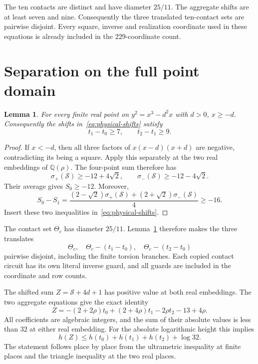 \documentclass[11pt,a4paper]{article}
\newtheorem{lemma}[theorem]{Lemma}
\newcommand{\Q}{\mathbb Q}\newcommand{\Z}{\mathbb Z}
\begin{document}
The ten contacts are distinct and have diameter $25/11$.
The aggregate shifts are at least seven and nine. Consequently
the three translated ten-contact sets are pairwise disjoint.
Every square, inverse and realization coordinate used in these
equations is already included in the 229-coordinate count.

\section{Separation on the full point domain}

\begin{lemma}\label{lem:separation}
For every finite real point on $y^2=x^3-d^2x$ with $d>0$,
$x\ge-d$. Consequently the shifts in~\eqref{eq:physical-shifts}
satisfy
\[
 t_1-t_0\ge7,\qquad t_2-t_1\ge9.
\]
\end{lemma}
\begin{proof}
If $x<-d$, then all three factors of $x(x-d)(x+d)$ are negative,
contradicting its being a square. Apply this separately at the two
real embeddings of $\Q(\rho)$. The four-point sum therefore has
\[
 \sigma_+(\mathcal S)\ge-12+4\sqrt2,
 \qquad \sigma_-(\mathcal S)\ge-12-4\sqrt2.
\]
Their average gives $S_0\ge-12$. Moreover,
\[
 S_0-S_1=
 \frac{(2-\sqrt2)\sigma_+(\mathcal S)
 +(2+\sqrt2)\sigma_-(\mathcal S)}4\ge-16.
\]
Insert these two inequalities in~\eqref{eq:physical-shifts}.
\end{proof}

The contact set $\Theta_c$ has diameter $25/11$.
Lemma~\ref{lem:separation} therefore makes the three translates
\[
 \Theta_c,\quad \Theta_c-(t_1-t_0),\quad
 \Theta_c-(t_2-t_0)
\]
pairwise disjoint, including the finite torsion branches.
Each copied contact circuit has its own literal inverse guard,
and all guards are included in the coordinate and row counts.

The shifted sum $Z=\mathcal S+4d+1$ has positive value at both
real embeddings. The two aggregate equations give the exact identity
\[
 Z=-(2+2\rho)t_0+(2+4\rho)t_1-2\rho t_2-13+4\rho.
\]
All coefficients are algebraic integers, and the sum of their
absolute values is less than $32$ at either real embedding.
For the absolute logarithmic height this implies
\begin{equation}\label{eq:height}
 h(Z)\le h(t_0)+h(t_1)+h(t_2)+\log32.
\end{equation}
The statement follows place by place from the ultrametric inequality
at finite places and the triangle inequality at the two real places.
\end{document}
